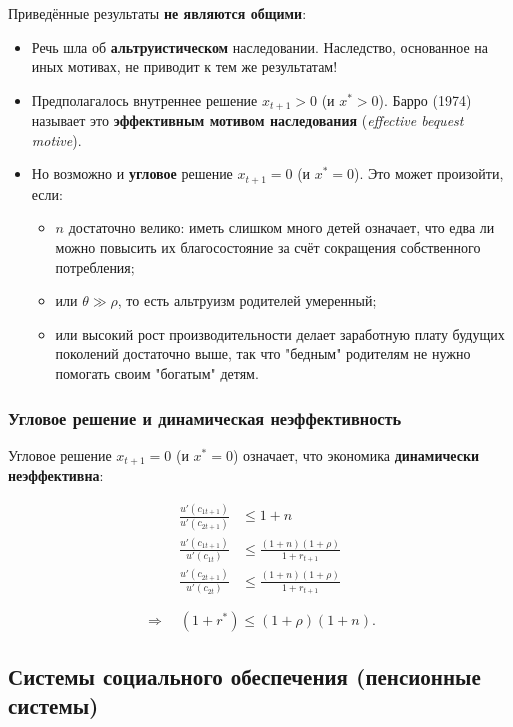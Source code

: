 \documentclass[10pt,a4paper]{article}
\begin{document}
Приведённые результаты \textbf{не являются общими}:
\begin{itemize}[leftmargin=1.3em]
\item Речь шла об \textbf{альтруистическом} наследовании. Наследство, основанное на иных мотивах, не приводит к тем же результатам!
\item Предполагалось внутреннее решение $x_{t+1}>0$ (и $x^{*}>0$). Барро (1974) называет это \textbf{эффективным мотивом наследования} (\textit{effective bequest motive}).
\item Но возможно и \textbf{угловое} решение $x_{t+1}=0$ (и $x^{*}=0$). Это может произойти, если:
  \begin{itemize}[leftmargin=1.3em]
  \item $n$ достаточно велико: иметь слишком много детей означает, что едва ли можно повысить их благосостояние за счёт сокращения собственного потребления;
  \item или $\theta \gg \rho$, то есть альтруизм родителей умеренный;
  \item или высокий рост производительности делает заработную плату будущих поколений достаточно выше, так что "бедным" родителям не нужно помогать своим "богатым" детям.
  \end{itemize}
\end{itemize}

\subsubsection{Угловое решение и динамическая неэффективность}

Угловое решение $x_{t+1}=0$ (и $x^{*}=0$) означает, что экономика \textbf{динамически неэффективна}:
\begin{formulabox}
\begin{align}
\frac{u'(c_{1t+1})}{u'(c_{2t+1})} &\le 1+n \tag{4.31}\\
\frac{u'(c_{1t+1})}{u'(c_{1t})} &\le \frac{(1+n)(1+\rho)}{1+r_{t+1}} \tag{4.32}\\
\frac{u'(c_{2t+1})}{u'(c_{2t})} &\le \frac{(1+n)(1+\rho)}{1+r_{t+1}} \tag{4.33}
\end{align}
\end{formulabox}
$$\Rightarrow \quad (1+r^{*}) \le (1+\rho)(1+n).$$

\subsection{Системы социального обеспечения (пенсионные системы)}
\end{document}
